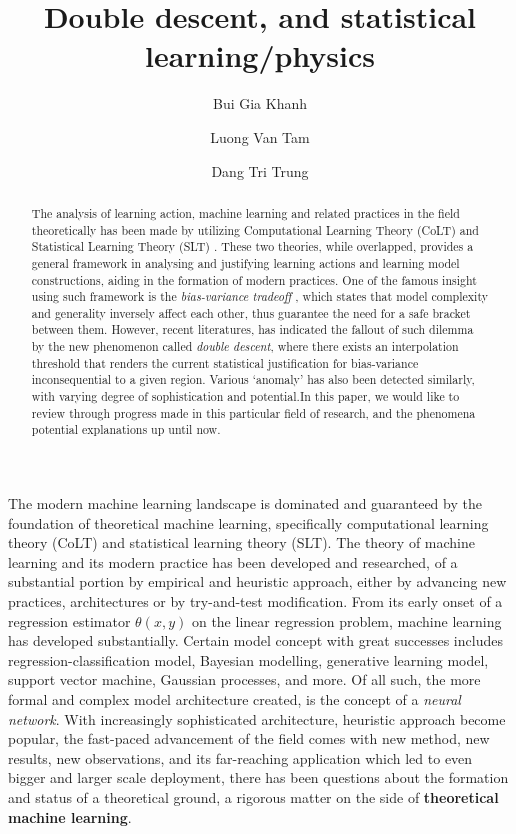 \documentclass[
  journal=largetwo,
  year=2025,
  volume=37,
]{cup-journal}
\title{Double descent, and statistical learning/physics}
\author{Bui Gia Khanh}
\affiliation{Department of Physics, Hanoi University of Science, Vietnam National University, Hanoi Vietnam}
\author{Luong Van Tam}
\affiliation{Department of Physics, Hanoi University of Science, Vietnam National University, Hanoi Vietnam}
\author{Dang Tri Trung}
\affiliation{Monash University, Department of Computer Science, Melbourne, Australia}
\begin{document}
\begin{abstract}
    The analysis of learning action, machine learning and related practices in the field theoretically has been made by utilizing Computational Learning Theory (CoLT) \cite{10.1145/1968.1972} and Statistical Learning Theory (SLT) \cite{Vapnik1999-VAPTNO}. These two theories, while overlapped, provides a general framework in analysing and justifying learning actions and learning model constructions, aiding in the formation of modern practices. One of the famous insight using such framework is the \textit{bias-variance tradeoff} \cite{6797087}, which states that model complexity and generality inversely affect each other, thus guarantee the need for a safe bracket between them. However, recent literatures, \cite{belkin_reconciling_2019} has indicated the fallout of such dilemma by the new phenomenon called \textit{double descent}, where there exists an interpolation threshold that renders the current statistical justification for bias-variance inconsequential to a given region. Various `anomaly' has also been detected similarly, with varying degree of sophistication and potential.In this paper, we would like to review through progress made in this particular field of research, and the phenomena potential explanations up until now. 
\end{abstract}

The modern machine learning landscape is dominated and guaranteed by the foundation of theoretical machine learning, specifically computational learning theory (CoLT) and statistical learning theory (SLT). The theory of machine learning and its modern practice has been developed and researched, of a substantial portion by empirical and heuristic approach, either by advancing new practices, architectures or by try-and-test modification. From its early onset of a regression estimator $\theta(x,y)$ on the linear regression problem, machine learning has developed substantially. Certain model concept with great successes includes regression-classification model, Bayesian modelling, generative learning model, support vector machine, Gaussian processes, and more. Of all such, the more formal and complex model architecture created, is the concept of a \textit{neural network}. With increasingly sophisticated architecture, heuristic approach become popular, the fast-paced advancement of the field comes with new method, new results, new observations, and its far-reaching application which led to even bigger and larger scale deployment, there has been questions about the formation and status of a theoretical ground, a rigorous matter on the side of \textbf{theoretical machine learning}.
\end{document}
